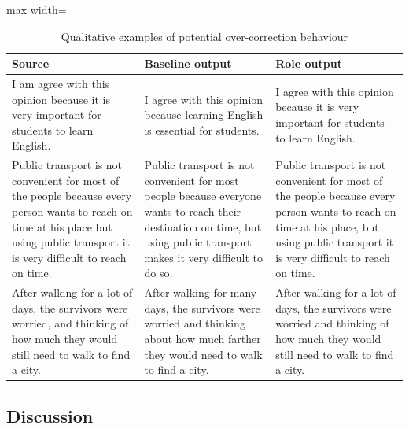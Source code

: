 \begin{table}[htbp]
    \centering
    \caption{Qualitative examples of potential over-correction behaviour}
    \label{tab:qualitative_examples}
    \renewcommand{\arraystretch}{1}
    \begin{adjustbox}{max width=\textwidth}
    \begin{tabularx}{\textwidth}{
        >{\raggedright\arraybackslash}p{}
        >{\raggedright\arraybackslash}p{}
        >{\raggedright\arraybackslash}p{}
    }
        \toprule
        \textbf{Source} & \textbf{Baseline output} & \textbf{Role output} \\
        \midrule
        I am agree with this opinion because it is very important for students to learn English.
        & I agree with this opinion because learning English is essential for students.
        & I agree with this opinion because it is very important for students to learn English. \\
        \addlinespace

        Public transport is not convenient for most of the people because every person wants to reach on time at his place but using public transport it is very difficult to reach on time.
        & Public transport is not convenient for most people because everyone wants to reach their destination on time, but using public transport makes it very difficult to do so.
        & Public transport is not convenient for most of the people because every person wants to reach on time at his place, but using public transport it is very difficult to reach on time. \\
        \addlinespace

        After walking for a lot of days, the survivors were worried, and thinking of how much they would still need to walk to find a city.
        & After walking for many days, the survivors were worried and thinking about how much farther they would need to walk to find a city.
        & After walking for a lot of days, the survivors were worried and thinking of how much they would still need to walk to find a city. \\
        \bottomrule
    \end{tabularx}
    \end{adjustbox}
\end{table}

\subsection{Discussion}

